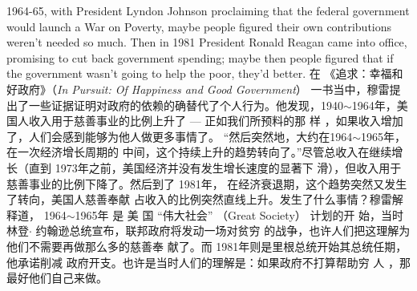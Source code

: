 \begin{paracol}{2}
1964-65, with President Lyndon Johnson proclaiming that the
federal government would launch a War on Poverty, maybe
people figured their own contributions weren't needed so
much. Then in 1981 President Ronald Reagan came into office,
promising to cut back government spending; maybe then people figured that if the government wasn't going to help the
poor, they'd better.
\switchcolumn
在 《追求：幸福和好政府》（\textit{In Pursuit: Of Happiness and Good Government}） 一书当中，穆雷提出了一些证据证明对政府的依赖的确替代了个人行为。他发现，1940$\sim$1964年，美
国人收入用于慈善事业的比例上升了 --- 正如我们所预料的那
样 ，如果收入增加了，人们会感到能够为他人做更多事情了。
“然后突然地，大约在1964$\sim$1965年，在一次经济增长周期的
中间，这个持续上升的趋势转向了。”尽管总收入在继续增长（直到 1973年之前，美国经济并没有发生增长速度的显著下
滑），但收入用于慈善事业的比例下降了。然后到了 1981年，
在经济衰退期，这个趋势突然又发生了转向，美国人慈善奉献
占收入的比例突然直线上升。发生了什么事情？穆雷解释道，
1964$\sim$1965年 是 美 国 “伟大社会” （Great  Society） 计划的开
始，当时林登$\cdot$ 约翰逊总统宣布，联邦政府将发动一场对贫穷
的战争，也许人们把这理解为他们不需要再做那么多的慈善奉
献了。而 1981年则是里根总统开始其总统任期，他承诺削减
政府开支。也许是当时人们的理解是：如果政府不打算帮助穷
人 ，那最好他们自己来做。


\end{paracol}
